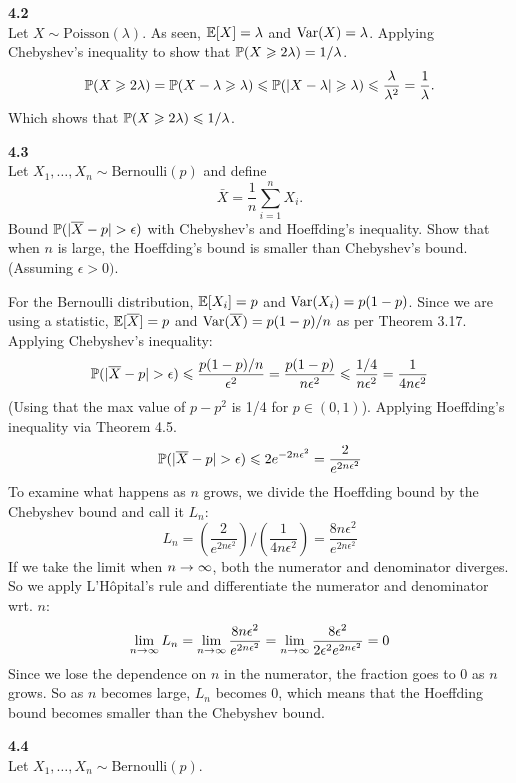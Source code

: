 \newpage\noindent
\textbf{4.2}\\  %
Let $X\sim\text{Poisson}(\lambda)$. As seen, $\E[X] = \lambda$ and
$\V(X) = \lambda$. Applying Chebyshev's inequality to show that
$\P(X\geq 2\lambda) = 1/\lambda$.
$$
\P(X \geq 2\lambda) = \P(X - \lambda \geq \lambda) \leq
\P(|X - \lambda| \geq \lambda) \leq \frac{\lambda}{\lambda^2} = \frac{1}{\lambda}.
$$
Which shows that $\P(X \geq 2\lambda) \leq 1/\lambda$.

\bigskip\noindent
\textbf{4.3}\\  %
Let $X_1,\ldots,X_n\sim\text{Bernoulli}(p)$ and define
$$
\bar{X} = \frac{1}{n}\sum_{i=1}^nX_i.
$$
Bound $\P(|\bar{X} - p| > \epsilon)$ with Chebyshev's and
Hoeffding's inequality. Show that when $n$ is large, the
Hoeffding's bound is smaller than Chebyshev's bound. (Assuming $\epsilon > 0)$.

For the Bernoulli distribution, $\E[X_i] = p$ and $\V(X_i) = p(1-p)$.
Since we are using a statistic, $\E[\bar{X}] = p$ and $\V(\bar{X}) = p(1-p)/n$
as per Theorem 3.17. Applying Chebyshev's inequality:
$$
\P(|\bar{X} - p| > \epsilon) \leq \frac{p(1-p)/n}{\epsilon^2} = \frac{p(1-p)}{n\epsilon^2}
\leq \frac{1/4}{n\epsilon^2} = \frac{1}{4n\epsilon^2}
$$
(Using that the max value of $p-p^2$ is 1/4 for $p\in(0,1)$).
Applying Hoeffding's inequality via Theorem 4.5.
$$
\P(|\bar{X} - p| > \epsilon) \leq 2e^{-2n\epsilon^2} = \frac{2}{e^{2n\epsilon^2}}
$$
To examine what happens as $n$ grows, we divide the Hoeffding bound by the Chebyshev bound
and call it $L_n$:
$$
L_n = 
\left(\frac{2}{e^{2n\epsilon^2}}\right)
\Big/
\left(\frac{1}{4n\epsilon^2}\right)
= \frac{8n\epsilon^2}{e^{2n\epsilon^2}}
$$
If we take the limit when $n\ra\infty$, both the numerator and denominator diverges.
So we apply L'Hôpital's rule and differentiate the numerator and denominator wrt. $n$:
$$
\lim_{n\ra\infty} L_n = 
\lim_{n\ra\infty} \frac{8n\epsilon^2}{e^{2n\epsilon^2}} = 
\lim_{n\ra\infty} \frac{8\epsilon^2}{2\epsilon^2e^{2n\epsilon^2}} = 0
$$
Since we lose the dependence on $n$ in the numerator, the fraction goes to 0 as $n$ grows.
So as $n$ becomes large, $L_n$ becomes 0, which means that the Hoeffding bound becomes
smaller than the Chebyshev bound.

\newpage\noindent
\textbf{4.4}\\  %
Let $X_1,\ldots,X_n\sim\text{Bernoulli}(p)$. 

